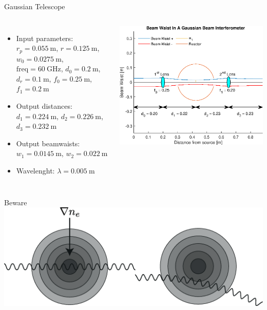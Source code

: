 \documentclass[hyperref={colorlinks=true,urlcolor=blue,linkcolor=.},aspectratio=1610,mathserif]{beamer}
\begin{document}
\begin{frame}{Gaussian Telescope}
	\begin{columns}
		\begin{itemize}
			\item Input parameters:\\
			      \(r_p = \SI{0.055}{\meter}\), \(r = \SI{0.125}{\meter}\),
			      \(w_0 = \SI{0.0275}{\meter}\), \(\mathrm{freq} = \SI{60}{\giga\hertz}\), \(d_0 = \SI{0.2}{\meter}\), \(d_r = \SI{0.1}{\meter}\), \(f_0 = \SI{0.25}{\meter}\), \(f_1 = \SI{0.2}{\meter}\)
			\item Output distances:\\
			      \(d_1 = \SI{0.224}{\meter}\), \(d_2 = \SI{0.226}{\meter}\), \(d_3 = \SI{0.232}{\meter}\)
			\item Output beamwaists:\\
			      \(w_1 = \SI{0.0145}{\meter}\), \(w_2 = \SI{0.022}{\meter}\)
			\item Wavelenght: \(\lambda = \SI{0.005}{\meter}\)
		\end{itemize}
		\includegraphics[width=\textwidth]{MatlabFigures/Interferometer/Interferometer.eps}
	\end{columns}
\end{frame}

\begin{frame}{Beware}
	\centering
	\includegraphics[width=\textwidth]{Figures/Refraction.eps}
\end{frame}
\end{document}
